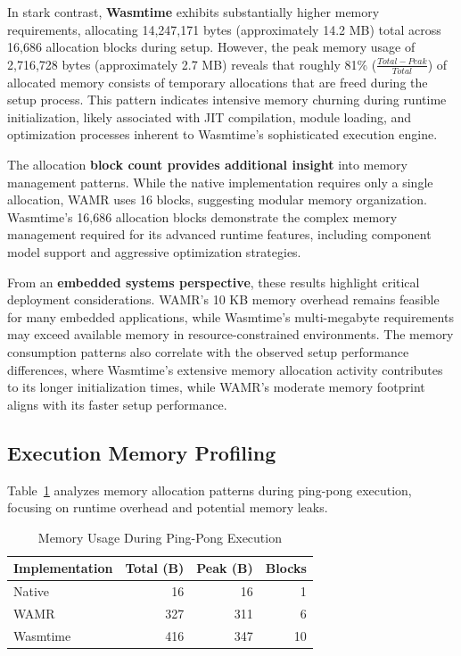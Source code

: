 In stark contrast, \textbf{Wasmtime} exhibits substantially higher memory requirements, allocating 14,247,171 bytes (approximately 14.2 MB) total across 16,686 allocation blocks during setup. However, the peak memory usage of 2,716,728 bytes (approximately 2.7 MB) reveals that roughly 81\% (\(\frac{Total-Peak}{Total}\)) of allocated memory consists of temporary allocations that are freed during the setup process. This pattern indicates intensive memory churning during runtime initialization, likely associated with JIT compilation, module loading, and optimization processes inherent to Wasmtime's sophisticated execution engine.

The allocation \textbf{block count provides additional insight} into memory management patterns. While the native implementation requires only a single allocation, WAMR uses 16 blocks, suggesting modular memory organization. Wasmtime's 16,686 allocation blocks demonstrate the complex memory management required for its advanced runtime features, including component model support and aggressive optimization strategies.

From an \textbf{embedded systems perspective}, these results highlight critical deployment considerations. WAMR's 10 KB memory overhead remains feasible for many embedded applications, while Wasmtime's multi-megabyte requirements may exceed available memory in resource-constrained environments. The memory consumption patterns also correlate with the observed setup performance differences, where Wasmtime's extensive memory allocation activity contributes to its longer initialization times, while WAMR's moderate memory footprint aligns with its faster setup performance.

\subsection{Execution Memory Profiling}
\label{subsec:memory-execution}

Table~\ref{tab:memory-execution} analyzes memory allocation patterns during ping-pong execution, focusing on runtime overhead and potential memory leaks.

\begin{table}[htbp]
    \centering
    \caption{Memory Usage During Ping-Pong Execution}
    \label{tab:memory-execution}
    \begin{tabular}{lrrr}
        \toprule
        \textbf{Implementation} & \textbf{Total (B)} & \textbf{Peak (B)} & \textbf{Blocks} \\
        \midrule
        Native        & 16   & 16  & 1 \\
        WAMR          & 327  & 311 & 6 \\
        Wasmtime      & 416  & 347 & 10 \\
        \bottomrule
    \end{tabular}
\end{table}

